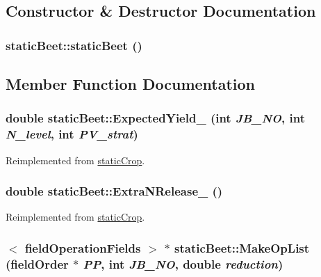 \subsection{Constructor \& Destructor Documentation}
\hypertarget{classstatic_beet_a9a5355c6bd94e14512d39563d4677d93}{
\subsubsection[{staticBeet}]{\setlength{\rightskip}{0pt plus 5cm}staticBeet::staticBeet ()}}
\label{classstatic_beet_a9a5355c6bd94e14512d39563d4677d93}


\subsection{Member Function Documentation}
\hypertarget{classstatic_beet_abfb3ec226a41b76f49b28240cd9e1aaf}{
\subsubsection[{ExpectedYield\_\-}]{\setlength{\rightskip}{0pt plus 5cm}double staticBeet::ExpectedYield\_\- (int {\em JB\_\-NO}, \/  int {\em N\_\-level}, \/  int {\em PV\_\-strat})}}
\label{classstatic_beet_abfb3ec226a41b76f49b28240cd9e1aaf}


Reimplemented from \hyperlink{classstatic_crop_ab7b9a8ecb31b10c4dcf44f13000e2f8c}{staticCrop}.\hypertarget{classstatic_beet_a22b6ff9f461a6c77c5d6f09b8f28ed89}{
\subsubsection[{ExtraNRelease\_\-}]{\setlength{\rightskip}{0pt plus 5cm}double staticBeet::ExtraNRelease\_\- ()}}
\label{classstatic_beet_a22b6ff9f461a6c77c5d6f09b8f28ed89}


Reimplemented from \hyperlink{classstatic_crop_afe0cb8a7831afa941a37338f05227d67}{staticCrop}.\hypertarget{classstatic_beet_afb13dbf6327c15857a6d9f1b1822b766}{
\subsubsection[{MakeOpList}]{$<$ {\bf fieldOperationFields} $>$ $\ast$ staticBeet::MakeOpList ({\bf fieldOrder} $\ast$ {\em PP}, \/  int {\em JB\_\-NO}, \/  double {\em reduction})}}
\label{classstatic_beet_afb13dbf6327c15857a6d9f1b1822b766}


